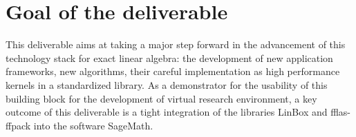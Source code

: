 \section*{Goal of the deliverable}

This deliverable aims at taking a major step forward in the advancement
of this technology stack for exact linear algebra: the development of
new application frameworks, new algorithms, their careful implementation
as high performance kernels in a standardized library. As a demonstrator
for the usability of this building block for the development of virtual
research environment, a key outcome of this deliverable is a tight
integration of the libraries LinBox and fflas-ffpack into the software
SageMath.

